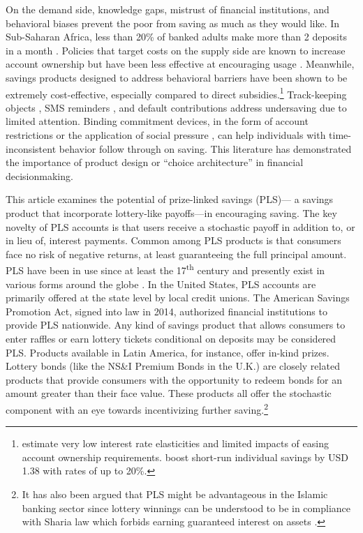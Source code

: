 \documentclass[12pt, titlepage]{article}
\begin{document}
	On the demand side, knowledge gaps, mistrust of financial institutions, and behavioral biases prevent the poor from saving as much as they would like. In Sub-Saharan Africa, less than 20\% of banked adults make more than 2 deposits in a month \parencite{demirguc-kunt_global_2015}. Policies that target costs on the supply side are known to increase account ownership but have been less effective at encouraging usage \parencite{dupas_why_2013,karlan_banking_2016}. Meanwhile, savings products designed to address behavioral barriers have been shown to be extremely cost-effective, especially compared to direct subsidies.\footnote{\textcite{karlan_price_2018} estimate very low interest rate elasticities and limited impacts of easing account ownership requirements. \textcite{schaner_persistent_2018} boost short-run individual savings by USD 1.38 with rates of up to 20\%.} Track-keeping objects \parencite{akbas_how_2016}, SMS reminders \parencite{karlan_getting_2010}, and default contributions \parencite{thaler_save_2004,chetty_active_2014,somville_saving_2018} address undersaving due to limited attention. Binding commitment devices, in the form of account restrictions \parencite{ashraf_tying_2006} or the application of social pressure \parencite{dupas_why_2013}, can help individuals with time-inconsistent behavior follow through on saving. This literature has demonstrated the importance of product design or ``choice architecture'' in financial decisionmaking.

	This article examines the potential of prize-linked savings (PLS)--- a savings product that incorporate lottery-like payoffs---in encouraging saving. The key novelty of PLS accounts is that users receive a stochastic payoff in addition to, or in lieu of, interest payments. Common among PLS products is that consumers face no risk of negative returns, at least guaranteeing the full principal amount. PLS have been in use since at least the 17\textsuperscript{th} century and presently exist in various forms around the globe \parencite{murphy_lotteries_2005,kearney_making_2010}. In the United States, PLS accounts are primarily offered at the state level by local credit unions. The American Savings Promotion Act, signed into law in 2014, authorized financial institutions to provide PLS nationwide. Any kind of savings product that allows consumers to enter raffles or earn lottery tickets conditional on deposits may be considered PLS. Products available in Latin America, for instance, offer in-kind prizes. Lottery bonds (like the NS\&I Premium Bonds in the U.K.) are closely related products that provide consumers with the opportunity to redeem bonds for an amount greater than their face value. These products all offer the stochastic component with an eye towards incentivizing further saving.\footnote{It has also been argued that PLS might be advantageous in the Islamic banking sector since lottery winnings can be understood to be in compliance with Sharia law which forbids earning guaranteed interest on assets \parencite{ruth_how_2018}.}
\end{document}
